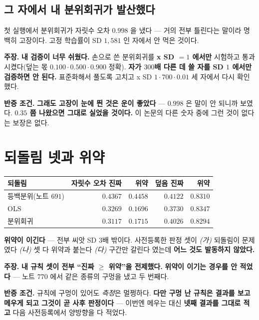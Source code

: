 \documentclass[10pt,a4paper]{article}
\newcommand{\claim}[2]{\begin{claimbox}\textbf{주장.} #1\par\smallskip
  \textcolor{gray!70}{\textbf{반증 조건.} #2}\end{claimbox}}
\begin{document}
\subsection*{그 자에서 내 분위회귀가 발산했다}

첫 실행에서 분위회귀가 자릿수 오차 $\mathbf{0.998}$ 을 냈다 --- 거의 전부 틀린다는
말이라 명백히 고장이다. 고정 학습률이 SD $1{,}581$ 인 자에서 안 먹은 것이다.

\claim{\textbf{내 검증이 너무 쉬웠다.} 손으로 쓴 분위회귀를 \textbf{x SD $=1$
에서만} 시험하고 통과시켰다(덮는 몫 $0.100 \cdot 0.500 \cdot 0.900$ 정확).
\textbf{자가 $300$배 다른 데 쓸 자를 SD $1$ 에서만 검증하면 안 된다.} 표준화해서
풀도록 고치고 x SD $1 \cdot 700 \cdot 0.01$ 세 자에서 다시 확인했다.}
{\textbf{그래도 고장이 눈에 띈 것은 운이 좋았다} --- $0.998$ 은 말이 안 되니까
보였다. \textbf{$0.35$ 쯤 나왔으면 그대로 실었을 것이다.} 이 논문의 다른 숫자
중에 그런 것이 없다는 보장은 없다.}

\section{되돌림 넷과 위약}

\begin{center}
\begin{tabular}{lrrrr}
\toprule
되돌림 & 자릿수 오차 진짜 & 위약 & 덮음 진짜 & 위약 \\
\midrule
등백분위(노트 $691$) & $0.4367$ & $0.4458$ & $0.4122$ & $\mathbf{0.8310}$ \\
OLS & $0.3269$ & $\mathbf{0.1696}$ & $0.3730$ & $\mathbf{0.8347}$ \\
분위회귀 & $0.3117$ & $\mathbf{0.1715}$ & $0.4026$ & $\mathbf{0.8294}$ \\
\bottomrule
\end{tabular}
\end{center}

\textbf{위약이 이긴다} --- 전부 씨앗 SD $3$배 밖이다. 사전등록한 판정 셋이
\emph{(가)} 되돌림이 문제였다 \emph{(나)} 셋 다 위약과 붙는다 \emph{(다)} 구간만
갈린다 였는데 \textbf{어느 것도 발동하지 않았다.}

\claim{\textbf{내 규칙 셋이 전부 ``진짜 $\geq$ 위약''을 전제했다.} \textbf{위약이
이기는 경우를 안 적었다} --- 노트 $770$ 에서 같은 종류의 구멍을 냈고 두 번째다.}
{규칙에 구멍이 있어도 \emph{측정}은 멀쩡하다. \textbf{다만 구멍 난 규칙은 결과를
보고 메우게 되고 그것이 곧 사후 판정이다} --- 이번엔 메우는 대신 \textbf{넷째
결과를 그대로 적고} 다음 사전등록에서 양방향을 다 적었다.}
\end{document}
